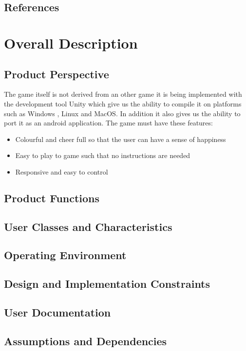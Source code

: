 \section{References}


\chapter{Overall Description}
\label{Overall Description}

\section{Product Perspective}
The game itself is not derived from an other game it is being implemented with the development tool Unity which give us the ability to compile it on platforms such as Windows , Linux and MacOS. In addition it also gives us the ability to port it as an android application.
The game must have these features:
\begin{itemize}
    \item Colourful and cheer full so that the user can have a sense of happiness 
    \item Easy to play to game such that no instructions are needed 
    \item Responsive and easy to control  
\end{itemize}
\section{Product Functions}


\section{User Classes and Characteristics}


\section{Operating Environment}

\section{Design and Implementation Constraints}

\section{User Documentation}

\section{Assumptions and Dependencies}

